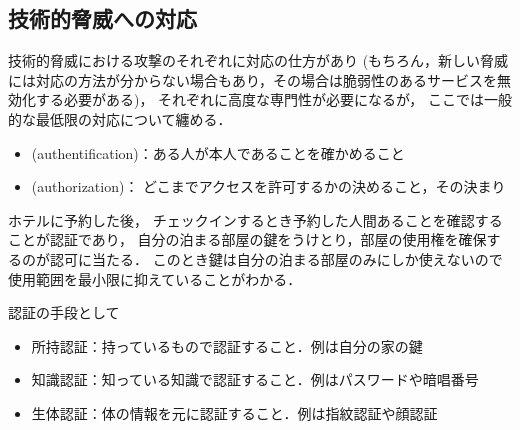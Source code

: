\begin{itemize}
\end{itemize}


\subsection{技術的脅威への対応}
技術的脅威における攻撃のそれぞれに対応の仕方があり
(もちろん，新しい脅威には対応の方法が分からない場合もあり，その場合は脆弱性のあるサービスを無効化する必要がある)，
それぞれに高度な専門性が必要になるが，
ここでは一般的な最低限の対応について纏める．

\emptyline
\begin{itemize}
   \item
      (authentification)：ある人が本人であることを確かめること
   \item
      (authorization)：
      どこまでアクセスを許可するかの決めること，その決まり

\end{itemize}

\begin{ex}
   ホテルに予約した後，
   チェックインするとき予約した人間あることを確認することが認証であり，
   自分の泊まる部屋の鍵をうけとり，部屋の使用権を確保するのが認可に当たる．
   このとき鍵は自分の泊まる部屋のみにしか使えないので
   使用範囲を最小限に抑えていることがわかる．
\end{ex}

認証の手段として
\begin{itemize}
   \item
      所持認証：持っているもので認証すること．例は自分の家の鍵   
   \item
      知識認証：知っている知識で認証すること．例はパスワードや暗唱番号
   \item
      生体認証：体の情報を元に認証すること．例は指紋認証や顔認証
\end{itemize}





